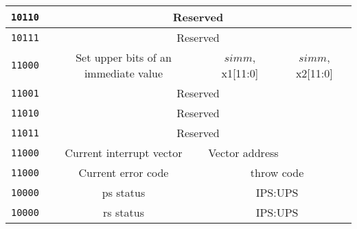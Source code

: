 \begin{center}
\begin{longtable}{|c|c|c|c|}
      \texttt{10110}                       &
      \multicolumn{3}{c|}{Reserved}        \\ \hline

      \texttt{10111}                       &
      \multicolumn{3}{c|}{Reserved}        \\ \hline

      \texttt{11000}                       &
      Set upper bits of an immediate value &
      {$simm$, x1[11:0]}                   &   
      {$simm$, x2[11:0]}                   \\ \hline
 
      \texttt{11001}                       &
      \multicolumn{3}{c|}{Reserved}        \\ \hline


      \texttt{11010}                       &
      \multicolumn{3}{c|}{Reserved}        \\ \hline

      \texttt{11011}                       &
      \multicolumn{3}{c|}{Reserved}        \\ \hline
    
      \texttt{11000}                       &
      Current interrupt vector             &
      \multicolumn{2}{|l|}{Vector address} \\ \hline

      \texttt{11000}                       &
      Current error code                   &
      \multicolumn{2}{c|}{throw code}      \\ \hline

      \texttt{10000}                       &
      \Gls{ps} status                      &
      \multicolumn{2}{c|}{IPS:UPS}         \\ \hline

      \texttt{10000}                       &
      \Gls{rs} status                      &
      \multicolumn{2}{c|}{IPS:UPS}         \\ \hline
    
  \end{longtable}
\end{center}  
\endgroup

